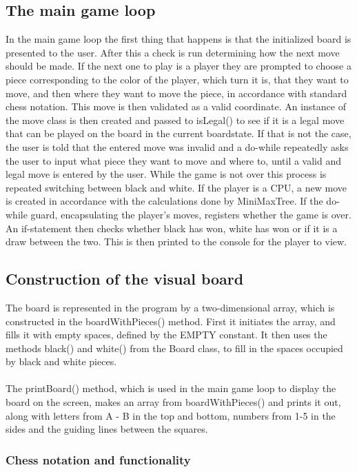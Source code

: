 \documentclass[12pt, a4paper]{article}
\begin{document}
\subsection{The main game loop}

In the main game loop the first thing that happens is that the initialized board is presented to the user. After this a check is run determining how the next move should be made. If the next one to play is a player they are prompted to choose a piece corresponding to the color of the player, which turn it is, that they want to move, and then where they want to move the piece, in accordance with standard chess notation. This move is then validated as a valid coordinate. An instance of the move class is then created and passed to isLegal() to see if it is a legal move that can be played on the board in the current boardstate. If that is not the case, the user is told that the entered move was invalid and a do-while repeatedly asks the user to input what piece they want to move and where to, until a valid and legal move is entered by the user. While the game is not over this process is repeated switching between black and white. If the player is a CPU, a new move is created in accordance with the calculations done by MiniMaxTree. If the do-while guard, encapsulating the player's moves, registers whether the game is over. An if-statement then checks whether black has won, white has won or if it is a draw between the two. This is then printed to the console for the player to view.

\subsection{Construction of the visual board}

The board is represented in the program by a two-dimensional array, which is constructed in the boardWithPieces() method.
First it initiates the array, and fills it with empty spaces, defined by the EMPTY constant.
It then uses the methods black() and white() from the Board class, to fill in the spaces occupied by black and white pieces.
\\\\
The printBoard() method, which is used in the main game loop to display the board on the screen, makes an array from boardWithPieces() and prints it out, along with letters from A - B in the top and bottom, numbers from 1-5 in the sides and the guiding lines between the squares.

\subsubsection{Chess notation and functionality}
\end{document}
